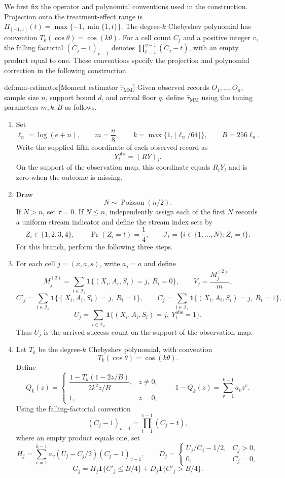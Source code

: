 \documentclass[11pt]{article}
\begin{document}
We first fix the operator and polynomial conventions used in the construction. Projection onto the treatment-effect range is
\(\Pi_{[-1,1]}(t)=\max\{-1,\min\{1,t\}\}\).
The degree-\(k\) Chebyshev polynomial  has convention
\(T_k(\cos\theta)=\cos(k\theta)\).
For a cell count \(C_j\) and a positive integer \(v\), the falling factorial
\((C_j-1)_{v-1}\) denotes \(\prod_{t=1}^{v-1}(C_j-t)\), with an empty product equal to one. These conventions specify the projection and polynomial correction in the following construction.

\begin{algorithmv}{def:mm-estimator}[Moment estimator $\widehat\tau_{\mathrm{MM}}$]
Given observed records \(O_1,\ldots,O_n\), sample size \(n\), support bound \(d\), and arrival floor \(q\), define \(\widehat\tau_{\mathrm{MM}}\) using the tuning parameters \(m,k,B\) as follows.
\begin{enumerate}
\item Set
\[
\ell_n=\log(e+n),\qquad
m=\frac n8,\qquad
k=\max\{1,\lfloor\ell_n/64\rfloor\},\qquad
B=256\ell_n.
\]
Write the supplied fifth coordinate of each observed record as
\[
Y_i^{\mathrm{obs}}=(RY)_i.
\]
On the support of the observation map, this coordinate equals \(R_iY_i\) and is zero when the outcome is missing.

\item Draw
\[
N\sim\operatorname{Poisson}(n/2).
\]
If \(N>n\), set \(\widetilde\tau=0\). If \(N\le n\), independently assign each of the first \(N\) records a uniform stream indicator and define the stream index sets by
\[
Z_i\in\{1,2,3,4\},\qquad
\Pr(Z_i=t)=\frac14,\qquad
\mathcal I_t=\{i\in\{1,\ldots,N\}:Z_i=t\}.
\]
For this branch, perform the following three steps.

\item For each cell \(j=(x,a,s)\), write \(a_j=a\) and define
\[
M_j^{(2)}
=\sum_{i\in\mathcal I_2}
\mathbf 1\{(X_i,A_i,S_i)=j,\ R_i=0\},
\qquad
V_j=\frac{M_j^{(2)}}m,
\]
\[
C'_j
=\sum_{i\in\mathcal I_3}
\mathbf 1\{(X_i,A_i,S_i)=j,\ R_i=1\},
\qquad
C_j
=\sum_{i\in\mathcal I_4}
\mathbf 1\{(X_i,A_i,S_i)=j,\ R_i=1\},
\]
\[
U_j
=\sum_{i\in\mathcal I_4}
\mathbf 1\{(X_i,A_i,S_i)=j,\ Y_i^{\mathrm{obs}}=1\}.
\]
Thus \(U_j\) is the arrived-success count on the support of the observation map.

\item Let \(T_k\) be the degree-\(k\) Chebyshev polynomial, with convention
\[
T_k(\cos\theta)=\cos(k\theta).
\]
Define
\[
Q_k(z)=
\begin{cases}
\dfrac{1-T_k(1-2z/B)}{2k^2z/B},&z\ne0,\\[6pt]
1,&z=0,
\end{cases}
\qquad
1-Q_k(z)=\sum_{v=1}^{k-1}a_vz^v.
\]
Using the falling-factorial convention
\[
(C_j-1)_{v-1}=\prod_{t=1}^{v-1}(C_j-t),
\]
where an empty product equals one, set
\[
H_j=\sum_{v=1}^{k-1}a_v(U_j-C_j/2)(C_j-1)_{v-1},
\qquad
D_j=
\begin{cases}
U_j/C_j-1/2,&C_j>0,\\
0,&C_j=0,
\end{cases}
\]
\[
G_j
=H_j\mathbf 1\{C'_j\le B/4\}
+D_j\mathbf 1\{C'_j>B/4\}.
\]


\end{enumerate}
\end{algorithmv}
\end{document}
